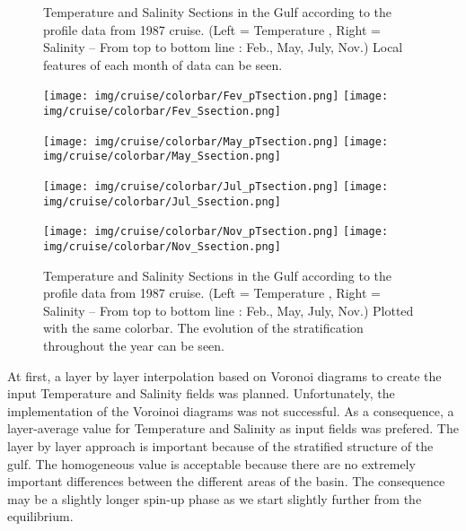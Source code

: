 \documentclass[english]{PFeENSTA}
\begin{document}
{\begin{figure}[H]
   \caption{\label{fig:profiles_Section_natcol} Temperature and Salinity Sections in the Gulf according to the profile data from 1987 cruise. (Left = Temperature , Right = Salinity -- From top to bottom line : Feb., May, July, Nov.) Local features of each month of data can be seen.}
\end{figure}

\begin{figure}[H]
   \begin{minipage}[h!]{1\linewidth}
	\centering
	\texttt{[image: img/cruise/colorbar/Fev\_pTsection.png]}
	\texttt{[image: img/cruise/colorbar/Fev\_Ssection.png]}
   \end{minipage}
   \begin{minipage}[h!]{1\linewidth}
	\centering
	\texttt{[image: img/cruise/colorbar/May\_pTsection.png]}
	\texttt{[image: img/cruise/colorbar/May\_Ssection.png]}
   \end{minipage}
   \begin{minipage}[h!]{1\linewidth}
	\centering
	\texttt{[image: img/cruise/colorbar/Jul\_pTsection.png]}
	\texttt{[image: img/cruise/colorbar/Jul\_Ssection.png]}
   \end{minipage}
   \begin{minipage}[h!]{1\linewidth}
	\centering
	\texttt{[image: img/cruise/colorbar/Nov\_pTsection.png]}
	\texttt{[image: img/cruise/colorbar/Nov\_Ssection.png]}
   \end{minipage} 
   
   \caption{\label{fig:profiles_Section_colorbar} Temperature and Salinity Sections in the Gulf according to the profile data from 1987 cruise. (Left = Temperature , Right = Salinity -- From top to bottom line : Feb., May, July, Nov.) Plotted with the same colorbar. The evolution of the stratification throughout the year can be seen.}
\end{figure}

At first, a layer by layer interpolation based on Voronoi diagrams to create the input Temperature and Salinity fields was planned. Unfortunately, the implementation of the Voroinoi diagrams was not successful. As a consequence, a layer-average value for Temperature and Salinity as input fields was prefered. The layer by layer approach is important because of the stratified structure of the gulf. The homogeneous value is acceptable because there are no extremely important differences between the different areas of the basin. The consequence may be a slightly longer spin-up phase as we start slightly further from the equilibrium. 

}
\end{document}
